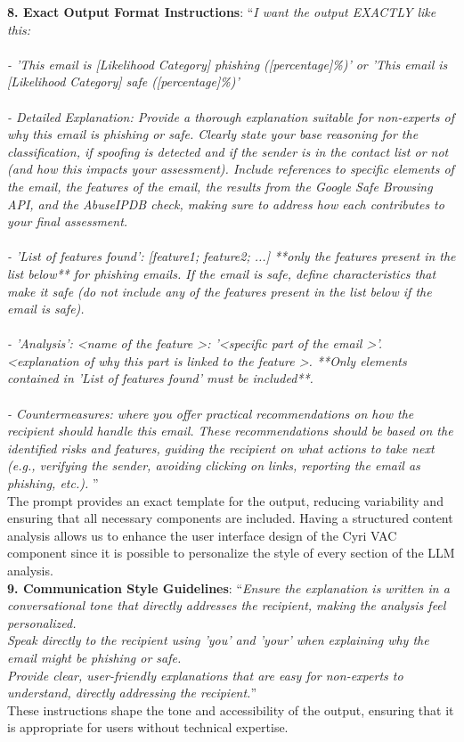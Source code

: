 \noindent \textbf{8. Exact Output Format Instructions}: ``\textit{I want the output EXACTLY like this: \\  \\
- 'This email is [Likelihood Category] phishing ([percentage]\%)' or 'This email is [Likelihood Category] safe ([percentage]\%)'\\ \\
- Detailed Explanation: Provide a thorough explanation suitable for non-experts of why this email is phishing or safe. Clearly state your base reasoning for the classification, if spoofing is detected and if the sender is in the contact list or not (and how this impacts your assessment). Include references to specific elements of the email, the features of the email, the results from the Google Safe Browsing API, and the AbuseIPDB check, making sure to address how each contributes to your final assessment. \\ \\
- 'List of features found': [feature1; feature2; ...] **only the features present in the list below** for phishing emails. If the email is safe, define characteristics that make it safe (do not include any of the features present in the list below if the email is safe). \\ \\
- 'Analysis': \textless name of the feature \textgreater: '\textless specific part of the email \textgreater'. \textless explanation of why this part is linked to the feature \textgreater. **Only elements contained in 'List of features found' must be included**. \\ \\
- Countermeasures: where you offer practical recommendations on how the recipient should handle this email. These recommendations should be based on the identified risks and features, guiding the recipient on what actions to take next (e.g., verifying the sender, avoiding clicking on links, reporting the email as phishing, etc.).
}'' \\
\indent The prompt provides an exact template for the output, reducing variability and ensuring that all necessary components are included. Having a structured content analysis allows us to enhance the user interface design of the Cyri VAC component since it is possible to personalize the style of every section of the LLM analysis.\\

\noindent \textbf{9. Communication Style Guidelines}: ``\textit{Ensure the explanation is written in a conversational tone that directly addresses the recipient, making the analysis feel personalized. \\
Speak directly to the recipient using 'you' and 'your' when explaining why the email might be phishing or safe. \\
Provide clear, user-friendly explanations that are easy for non-experts to understand, directly addressing the recipient.}'' \\
\indent These instructions shape the tone and accessibility of the output, ensuring that it is appropriate for users without technical expertise.\\


